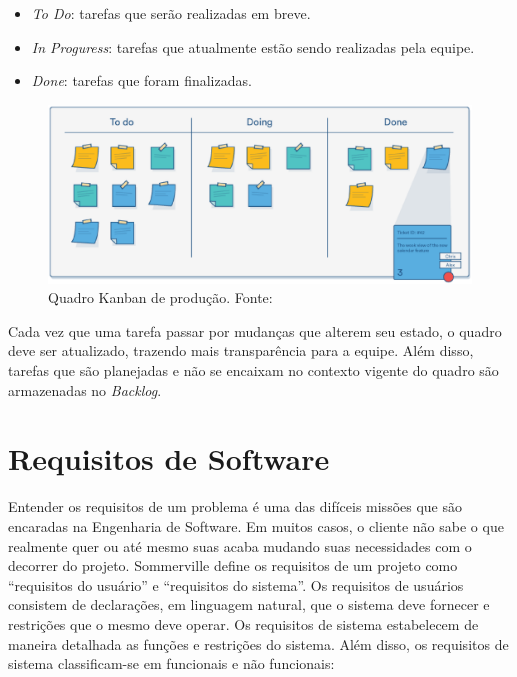     \begin{itemize}
        \item \textit{To Do}: tarefas que serão realizadas em breve.
        \item \textit{In Proguress}: tarefas que atualmente estão sendo realizadas pela equipe.
        \item \textit{Done}: tarefas que foram finalizadas.
    \end{itemize}

    \begin{figure}[!htpb]
        \centering
        \includegraphics[keepaspectratio=true,scale=0.5]{figuras/kanban.eps}
        \caption{Quadro Kanban de produção. Fonte: \cite{radigan_2015}}
        \label{kanban}
    \end{figure}

    Cada vez que uma tarefa passar por mudanças que alterem seu estado, o quadro deve ser atualizado, trazendo mais transparência para a equipe. Além disso, tarefas que são planejadas e não se encaixam no contexto vigente do quadro são armazenadas no \textit{Backlog}.

\section{Requisitos de Software}
Entender os requisitos de um problema é uma das difíceis missões
que são encaradas na Engenharia de Software. Em muitos casos, o cliente não sabe o que realmente quer ou até mesmo
suas acaba mudando suas necessidades com o decorrer do projeto.   Sommerville \cite{sommerville_2006} define os requisitos de um projeto como ``requisitos do usuário'' e ``requisitos do sistema''. Os requisitos de usuários consistem de declarações, em
linguagem natural, que o sistema deve fornecer e restrições que o mesmo deve
operar. Os requisitos de sistema estabelecem de maneira detalhada as
funções e restrições do sistema. Além disso, os requisitos de sistema
classificam-se em funcionais e não funcionais:

